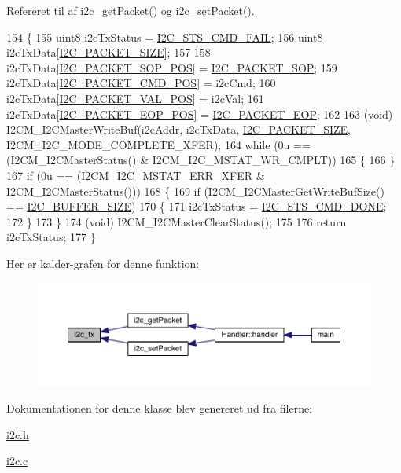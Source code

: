 Refereret til af i2c\+\_\+get\+Packet() og i2c\+\_\+set\+Packet().


\begin{DoxyCode}
154 \{
155   uint8 i2cTxStatus = \hyperlink{i2c_8h_aee0adbd7dcb13e95337369b7342a27e3}{I2C\_STS\_CMD\_FAIL};
156   uint8 i2cTxData[\hyperlink{i2c_8h_a8c24abf58121f3c16b5f687cc2946cd1}{I2C\_PACKET\_SIZE}];
157   
158   i2cTxData[\hyperlink{i2c_8h_a1207f4b2c3692b1a344f0013da629310}{I2C\_PACKET\_SOP\_POS}] = \hyperlink{i2c_8h_a52bb5b964361ed2f1b18df32c5b8f2c5}{I2C\_PACKET\_SOP};
159   i2cTxData[\hyperlink{i2c_8h_ac13fcfeded7dc2d82fa4734456f3761f}{I2C\_PACKET\_CMD\_POS}] = i2cCmd;
160   i2cTxData[\hyperlink{i2c_8h_a68506c3651f015716bb2c135e8e7b972}{I2C\_PACKET\_VAL\_POS}] = i2cVal;
161   i2cTxData[\hyperlink{i2c_8h_a940f0ea8103872c7ba81b9dc0f121feb}{I2C\_PACKET\_EOP\_POS}] = \hyperlink{i2c_8h_a62b4ae6e51a3d0da47f5165165cdbc0a}{I2C\_PACKET\_EOP};
162   
163   (void) I2CM\_I2CMasterWriteBuf(i2cAddr, i2cTxData, \hyperlink{i2c_8h_a8c24abf58121f3c16b5f687cc2946cd1}{I2C\_PACKET\_SIZE}, 
      I2CM\_I2C\_MODE\_COMPLETE\_XFER);
164   \textcolor{keywordflow}{while} (0u == (I2CM\_I2CMasterStatus() & I2CM\_I2C\_MSTAT\_WR\_CMPLT))
165   \{
166   \}
167   \textcolor{keywordflow}{if} (0u == (I2CM\_I2C\_MSTAT\_ERR\_XFER & I2CM\_I2CMasterStatus()))
168   \{
169     \textcolor{keywordflow}{if} (I2CM\_I2CMasterGetWriteBufSize() == \hyperlink{i2c_8h_a6458dbf193a0eef0470fc1b08400bfcd}{I2C\_BUFFER\_SIZE})
170     \{
171       i2cTxStatus = \hyperlink{i2c_8h_a7f8f53679384fa228bf06779cc168cfd}{I2C\_STS\_CMD\_DONE};
172     \}
173   \}
174   (void) I2CM\_I2CMasterClearStatus();
175   
176   \textcolor{keywordflow}{return} i2cTxStatus;
177 \}
\end{DoxyCode}


Her er kalder-\/grafen for denne funktion\+:\nopagebreak
\begin{figure}[H]
\begin{center}
\leavevmode
\includegraphics[width=350pt]{class_i2_c_a6e8687e512564fb2b0201d5fdbecba65_icgraph}
\end{center}
\end{figure}




Dokumentationen for denne klasse blev genereret ud fra filerne\+:\begin{DoxyCompactItemize}
\item 
\hyperlink{i2c_8h}{i2c.\+h}\item 
\hyperlink{i2c_8c}{i2c.\+c}\end{DoxyCompactItemize}
